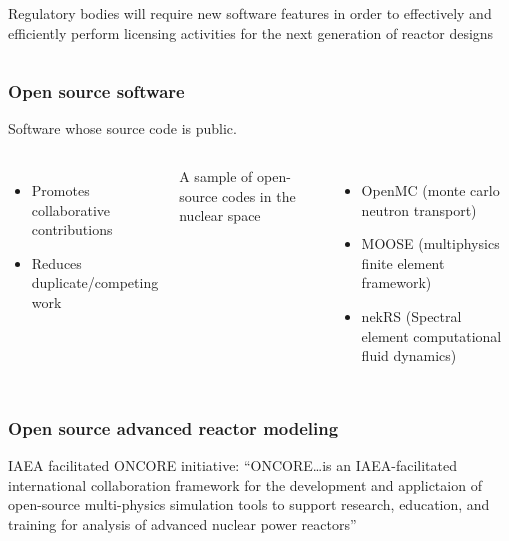 \begin{frame}
\begin{columns}
        \column[t]{5cm}
        Regulatory bodies will require new software features in order to effectively and efficiently perform licensing activities for the next generation of reactor designs\cite{usnrc_nonlwr_2020-1}
    \end{columns}
\end{frame}

\begin{frame}
    \frametitle{Open source software}
    Software whose source code is public.
    
    \begin{columns}
        \column[t]{5cm}
        \begin{itemize}
            \item Promotes collaborative contributions
            \item Reduces duplicate/competing work
        \end{itemize}

        \pause
        \column[t]{5cm}
        A sample of open-source codes in the nuclear space
        \begin{itemize}
            \item OpenMC (monte carlo neutron transport)
            \item MOOSE (multiphysics finite element framework)
            \item nekRS (Spectral element computational fluid dynamics)
        \end{itemize}
    \end{columns}
\end{frame}

\begin{frame}
    \frametitle{Open source advanced reactor modeling}
    \Gls{IAEA} facilitated \Gls{ONCORE} initiative\cite{fiorina_initiative_2021}:
    \newline
    \newline
    \noindent ``ONCORE\ldots is an IAEA-facilitated international collaboration framework for the development and applictaion of open-source multi-physics simulation tools to support research, education, and training for analysis of advanced nuclear power reactors''\cite{iaea_open-source}
\end{frame}


